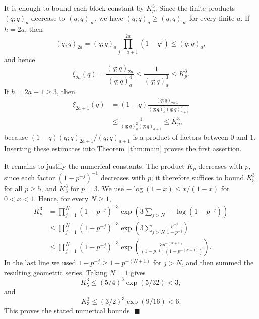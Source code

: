 \documentclass[a4paper,11pt,reqno]{amsart}
\theoremstyle{plain}
\theoremstyle{remark}
\numberwithin{equation}{section}
\renewcommand{\leq}{\leqslant}
\renewcommand{\geq}{\geqslant}
\newenvironment{proofof}{{\bf Proof. }}{\hfill $\blacksquare$ \\}
\begin{document}
\begin{proofof}
It is enough to bound each block constant by $K_p^3$. Since the finite products
$(q;q)_a$ decrease to $(q;q)_\infty$, we have
$(q;q)_a\geq (q;q)_\infty$ for every finite $a$. If $h=2a$, then
\[
        (q;q)_{2a}
        =
        (q;q)_a\prod_{j=a+1}^{2a}(1-q^j)
        \leq (q;q)_a,
\]
and hence
\[
        \xi_{2a}(q)=
        \frac{(q;q)_{2a}}{(q;q)_a^4}
        \leq
        \frac{1}{(q;q)_a^3}
        \leq
        K_p^3.
\]
If $h=2a+1\geq 3$, then
\[
\begin{aligned}
        \xi_{2a+1}(q)
        &=(1-q)\frac{(q;q)_{2a+1}}{(q;q)_a^2(q;q)_{a+1}^2}  \\
        &\leq
        \frac{1}{(q;q)_a^2(q;q)_{a+1}}
        \leq K_p^3,
\end{aligned}
\]
because $(1-q)(q;q)_{2a+1}/(q;q)_{a+1}$ is a product of factors between $0$
and $1$. Inserting these estimates into Theorem~\ref{thm:main} proves the first
assertion.

It remains to justify the numerical constants. The product $K_p$ decreases with
$p$, since each factor $(1-p^{-j})^{-1}$ decreases with $p$; it therefore
suffices to bound $K_5^3$ for all $p\geq 5$, and $K_3^3$ for $p=3$. We use
$-\log(1-x)\leq x/(1-x)$ for $0<x<1$. Hence, for every $N\geq 1$,
\[
\begin{aligned}
        K_p^3
        &=
        \prod_{j=1}^{N}(1-p^{-j})^{-3}
        \exp\left(3\sum_{j>N}-\log(1-p^{-j})\right)       \\
        &\leq
        \prod_{j=1}^{N}(1-p^{-j})^{-3}
        \exp\left(3\sum_{j>N}\frac{p^{-j}}{1-p^{-j}}\right)       \\
        &\leq
        \prod_{j=1}^{N}(1-p^{-j})^{-3}
        \exp\left(
        \frac{3p^{-(N+1)}}{(1-p^{-1})(1-p^{-(N+1)})}
        \right).
\end{aligned}
\]
In the last line we used $1-p^{-j}\geq 1-p^{-(N+1)}$ for $j>N$, and then
summed the resulting geometric series. 
Taking $N=1$ gives
\[
        K_5^3
        \leq
        \left(5/4\right)^3
        \exp\left(5/32\right)
        <3,
\]
and
\[
        K_3^3
        \leq
        \left(3/2\right)^3
        \exp\left(9/16\right)
        <6.
\]
This proves the stated numerical bounds.
\end{proofof}
\end{document}
